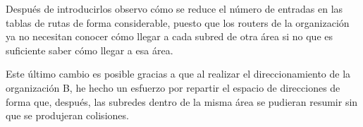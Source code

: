 \par Después de introducirlos observo cómo se reduce el número de entradas en las tablas de rutas de forma considerable, puesto que los routers de la organización ya no necesitan conocer cómo llegar a cada subred de otra área si no que es suficiente saber cómo llegar a esa área.
\par Este último cambio es posible gracias a que al realizar el direccionamiento de la organización B, he hecho un esfuerzo por repartir el espacio de direcciones de forma que, después, las subredes dentro de la misma área se pudieran resumir sin que se produjeran colisiones.








